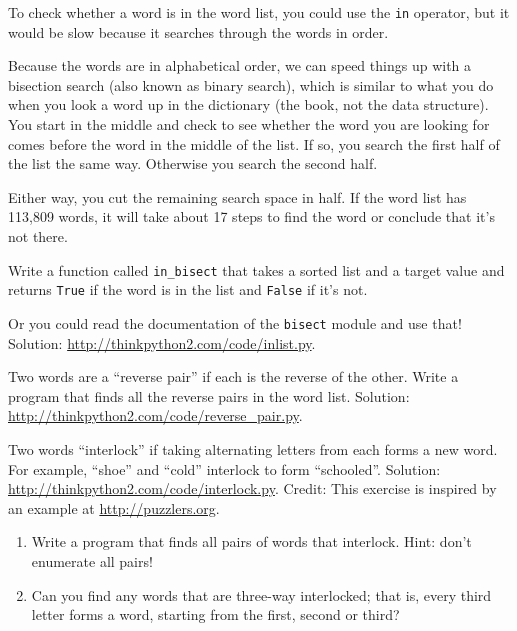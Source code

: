 \documentclass[10pt]{book}
\begin{document}
\begin{exercise}
\label{wordlist1}
\label{bisection}

To check whether a word is in the word list, you could use
the {\tt in} operator, but it would be slow because it searches
through the words in order.

Because the words are in alphabetical order, we can speed things up
with a bisection search (also known as binary search), which is
similar to what you do when you look a word up in the dictionary (the book, not the data structure).  You
start in the middle and check to see whether the word you are looking
for comes before the word in the middle of the list.  If so, you
search the first half of the list the same way.  Otherwise you search
the second half.

Either way, you cut the remaining search space in half.  If the
word list has 113,809 words, it will take about 17 steps to
find the word or conclude that it's not there.

Write a function called \verb"in_bisect" that takes a sorted list
and a target value and returns {\tt True} if the word is
in the list and {\tt False} if it's not.

Or you could read the documentation of the {\tt bisect} module
and use that!  Solution: \url{http://thinkpython2.com/code/inlist.py}.

\end{exercise}

\begin{exercise}

Two words are a ``reverse pair'' if each is the reverse of the
other.  Write a program that finds all the reverse pairs in the
word list.  Solution: \url{http://thinkpython2.com/code/reverse_pair.py}.

\end{exercise}

\begin{exercise}

Two words ``interlock'' if taking alternating letters from each forms
a new word.  For example, ``shoe'' and ``cold''
interlock to form ``schooled''.
Solution: \url{http://thinkpython2.com/code/interlock.py}.
Credit: This exercise is inspired by an example at \url{http://puzzlers.org}.

\begin{enumerate}

\item Write a program that finds all pairs of words that interlock.
  Hint: don't enumerate all pairs!

\item Can you find any words that are three-way interlocked; that is,
  every third letter forms a word, starting from the first, second or
  third?

\end{enumerate}
\end{exercise}
\end{document}
